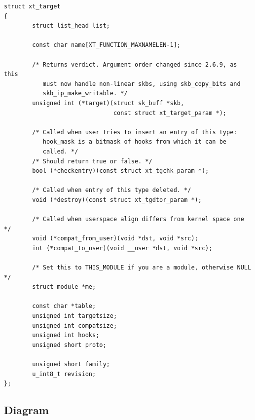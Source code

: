 \documentclass[a4paper,10pt]{article}
\begin{document}
\begin{lstlisting}
struct xt_target
{
        struct list_head list;

        const char name[XT_FUNCTION_MAXNAMELEN-1];

        /* Returns verdict. Argument order changed since 2.6.9, as this                                                                                     
           must now handle non-linear skbs, using skb_copy_bits and                                                                                         
           skb_ip_make_writable. */
        unsigned int (*target)(struct sk_buff *skb,
                               const struct xt_target_param *);

        /* Called when user tries to insert an entry of this type:                                                                                          
           hook_mask is a bitmask of hooks from which it can be                                                                                             
           called. */
        /* Should return true or false. */
        bool (*checkentry)(const struct xt_tgchk_param *);

        /* Called when entry of this type deleted. */
        void (*destroy)(const struct xt_tgdtor_param *);

        /* Called when userspace align differs from kernel space one */
        void (*compat_from_user)(void *dst, void *src);
        int (*compat_to_user)(void __user *dst, void *src);

        /* Set this to THIS_MODULE if you are a module, otherwise NULL */
        struct module *me;

        const char *table;
        unsigned int targetsize;
        unsigned int compatsize;
        unsigned int hooks;
        unsigned short proto;

        unsigned short family;
        u_int8_t revision;
};
\end{lstlisting}

\subsection{Diagram}
\end{document}
